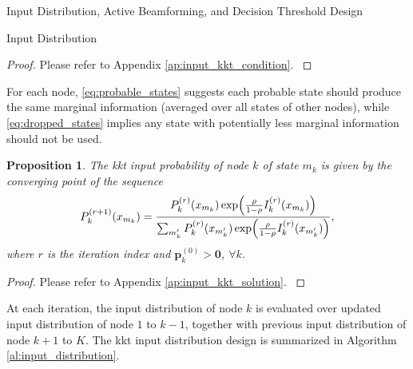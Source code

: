 \documentclass[journal]{IEEEtran}
\newtheorem{proposition}{Proposition}
\begin{document}
\begin{section}{Input Distribution, Active Beamforming, and Decision Threshold Design}
\begin{subsection}{Input Distribution}
		\begin{proof}
			Please refer to Appendix \ref{ap:input_kkt_condition}.
			\label{pf:input_kkt_condition}
		\end{proof}

		For each node, \eqref{eq:probable_states} suggests each probable state should produce the same marginal information (averaged over all states of other nodes), while \eqref{eq:dropped_states} implies any state with potentially less marginal information should not be used.
		\begin{proposition}
			The \gls{kkt} input probability of node $k$ of state $m_k$ is given by the converging point of the sequence
			\begin{equation}
				P_k^{(r+1)}(x_{m_k}) = \frac{P_k^{(r)}(x_{m_k}) \exp \Bigl( \frac{\rho}{1 - \rho} I_k^{(r)}(x_{m_k}) \Bigr)}{\sum_{m_k'} P_k^{(r)}(x_{m_k'}) \exp \Bigl( \frac{\rho}{1 - \rho} I_k^{(r)}(x_{m_k'}) \Bigr)},
				\label{eq:input_kkt_solution}
			\end{equation}
			where $r$ is the iteration index and $\boldsymbol{p}_k^{(0)} > \boldsymbol{0}$, $\forall k$.
			\label{pr:input_kkt_solution}
		\end{proposition}
		\begin{proof}
			Please refer to Appendix \ref{ap:input_kkt_solution}.
			\label{pf:input_kkt_solution}
		\end{proof}

		At each iteration, the input distribution of node $k$ is evaluated over updated input distribution of node $1$ to $k-1$, together with previous input distribution of node $k+1$ to $K$. The \gls{kkt} input distribution design is summarized in Algorithm \ref{al:input_distribution}.


\end{subsection}
\end{section}
\end{document}
